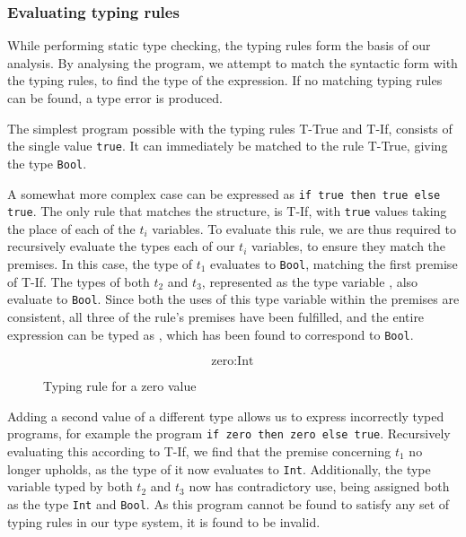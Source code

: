 \documentclass[nofilelist]{cslthse-msc}
\begin{document}
\subsubsection{Evaluating typing rules}
While performing static type checking, the typing rules form the basis of our analysis.
By analysing the program, we attempt to match the syntactic form with the typing rules, to find the type of the expression.
If no matching typing rules can be found, a type error is produced.

The simplest program possible with the typing rules T-True and T-If, consists of the single value \lstinline{true}.
It can immediately be matched to the rule T-True, giving the type \lstinline{Bool}.

A somewhat more complex case can be expressed as \lstinline{if true then true else }\\\lstinline{true}.
The only rule that matches the structure, is T-If, with \lstinline{true} values taking the place of each of the $t_i$ variables.
To evaluate this rule, we are thus required to recursively evaluate the types each of our $t_i$ variables, to ensure they match the premises.
In this case, the type of $t_1$ evaluates to \lstinline{Bool}, matching the first premise of T-If.
The types of both $t_2$ and $t_3$, represented as the type variable , also evaluate to \lstinline{Bool}.
Since both the uses of this type variable within the premises are consistent, all three of the rule's premises have been fulfilled, and the entire expression can be typed as , which has been found to correspond to \lstinline{Bool}.

\begin{figure}[h]
  \begin{equation}
    \tag{T-Zero}
    \text{zero} : \text{Int}
  \end{equation}
  \caption{Typing rule for a zero value}
  \label{typingruleexamplezero}
\end{figure}

Adding a second value of a different type allows us to express incorrectly typed programs, for example the program \lstinline{if zero then zero else true}.
Recursively evaluating this according to T-If, we find that the premise concerning $t_1$ no longer upholds, as the type of it now evaluates to \lstinline{Int}.
Additionally, the type variable  typed by both $t_2$ and $t_3$ now has contradictory use, being assigned both as the type \lstinline{Int} and \lstinline{Bool}.
As this program cannot be found to satisfy any set of typing rules in our type system, it is found to be invalid.
\end{document}
